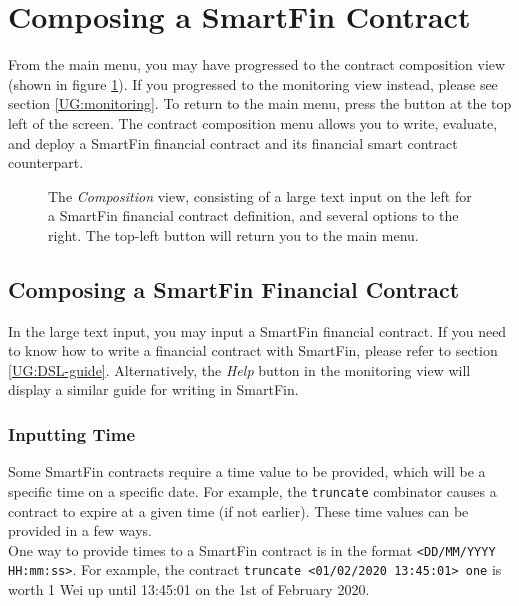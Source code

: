\section{Composing a SmartFin Contract} \label{UG:composition}

From the main menu, you may have progressed to the contract composition view (shown in figure \ref{UG:fig:composition}). If you progressed to the monitoring view instead, please see section \ref{UG:monitoring}. To return to the main menu, press the button at the top left of the screen. The contract composition menu allows you to write, evaluate, and deploy a SmartFin financial contract and its financial smart contract counterpart.

\begin{figure}[h]
    \centering
    \caption{The \textit{Composition} view, consisting of a large text input on the left for a SmartFin financial contract definition, and several options to the right. The top-left button will return you to the main menu.}
    \label{UG:fig:composition}
\end{figure}

\subsection{Composing a SmartFin Financial Contract}

In the large text input, you may input a SmartFin financial contract. If you need to know how to write a financial contract with SmartFin, please refer to section \ref{UG:DSL-guide}. Alternatively, the \textit{Help} button in the monitoring view will display a similar guide for writing in SmartFin.


\subsubsection{Inputting Time} \label{UG:time-input}

Some SmartFin contracts require a time value to be provided, which will be a specific time on a specific date. For example, the \texttt{truncate} combinator causes a contract to expire at a given time (if not earlier). These time values can be provided in a few ways. \\

One way to provide times to a SmartFin contract is in the format \texttt{<DD/MM/YYYY HH:mm:ss>}. For example, the contract \texttt{truncate <01/02/2020 13:45:01> one} is worth 1 Wei up until 13:45:01 on the 1st of February 2020.

